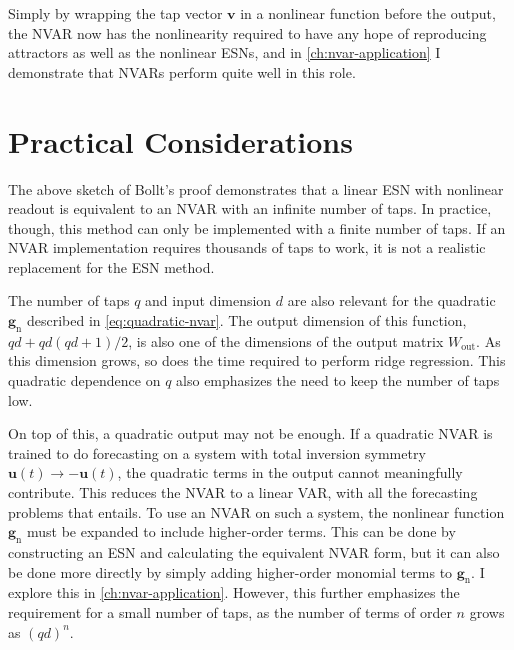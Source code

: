 Simply by wrapping the tap vector $\bm{v}$ in a nonlinear function
before the output, the NVAR now has the nonlinearity required to have
any hope of reproducing attractors as well as the nonlinear ESNs, and
in \cref{ch:nvar-application} I demonstrate that NVARs perform
quite well in this role.

\section{Practical Considerations}

The above sketch of Bollt's proof demonstrates that a linear ESN with nonlinear
readout is equivalent to an NVAR with an infinite number of taps. In
practice, though, this method can only be implemented with a finite
number of taps. If an NVAR implementation requires thousands of taps
to work, it is not a realistic replacement for the ESN method.

The number of taps $q$ and input dimension $d$ are also relevant for the quadratic
$\bm{g}_\text{n}$ described in \cref{eq:quadratic-nvar}. The output
dimension of this function, $qd + qd(qd + 1)/2$, is also one of the
dimensions of the output matrix $W_\text{out}$. As this dimension
grows, so does the time required to perform ridge regression. This
quadratic dependence on $q$ also emphasizes the need to keep the
number of taps low.

On top of this, a quadratic output may not be enough. If a quadratic
NVAR is trained to do forecasting on a system with total inversion
symmetry $\bm{u}(t) \rightarrow -\bm{u}(t)$, the quadratic terms in
the output cannot meaningfully contribute. This reduces the NVAR to a
linear VAR, with all the forecasting problems that entails. To use an
NVAR on such a system, the nonlinear function $\bm{g}_\text{n}$ must
be expanded to include higher-order terms. This can be done by
constructing an ESN and calculating the equivalent NVAR form, but it
can also be done more directly by simply adding higher-order monomial terms to
$\bm{g}_\text{n}$. I explore this in
\cref{ch:nvar-application}. However, this further emphasizes the
requirement for a small number of taps, as the number of terms of
order $n$ grows as $(qd)^n$.

